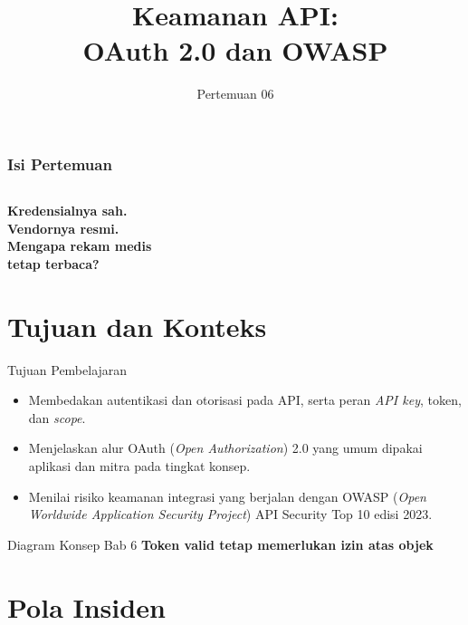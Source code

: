 \documentclass[aspectratio=169, table, 12pt]{beamer}
\title{\Huge Keamanan API:\\ \vspace{10pt} OAuth 2.0 dan OWASP}
\date{Pertemuan 06}
\begin{document}
\frame{\titlepage}

\begin{frame}
  \frametitle{Isi Pertemuan}
  \vspace{14pt}
  \begin{columns}[t]
    {\small\tableofcontents[sections={1-4}]}

    {\small\tableofcontents[sections={5-9}]}
  \end{columns}
\end{frame}

\begin{frame}{\hfill}
  \centering
  \Huge{\textbf{Kredensialnya sah.\\Vendornya resmi.\\Mengapa rekam medis\\tetap terbaca?}}
\end{frame}

\section{Tujuan dan Konteks}

\begin{frame}{{\Large Tujuan Pembelajaran}}
  \vspace{10pt}
  \begin{itemize}
    \item Membedakan autentikasi dan otorisasi pada API, serta peran \textit{API key}, token, dan \textit{scope}.
    \item Menjelaskan alur OAuth (\textit{Open Authorization}) 2.0 yang umum dipakai aplikasi dan mitra pada tingkat konsep.
    \item Menilai risiko keamanan integrasi yang berjalan dengan OWASP (\textit{Open Worldwide Application Security Project}) API Security Top 10 edisi 2023.
  \end{itemize}
\end{frame}

\begin{frame}{{\Large Diagram Konsep Bab 6}}
  \centering
  {\small\bfseries Token valid tetap memerlukan izin atas objek}\par\medskip
\end{frame}

\section{Pola Insiden}
\end{document}
